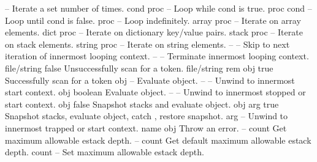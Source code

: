 \begin{longtable}{}
	{--}
	{Iterate a set number of times.}
\hline
\optableent
	{cond proc}
	{{\bf {}}}
	{--}
	{ Loop while cond is true.}
\hline
\optableent
	{proc cond}
	{{\bf {}}}
	{--}
	{ Loop until cond is false.}
\hline
\optableent
	{proc}
	{{\bf {}}}
	{--}
	{ Loop indefinitely.}
\hline
\optableent
	{array proc}
	{{\bf {}}}
	{--}
	{Iterate on array elements.}
\optableent
	{dict proc}
	{{\bf {}}}
	{--}
	{Iterate on dictionary key/value pairs.}
\optableent
	{stack proc}
	{{\bf {}}}
	{--}
	{Iterate on stack elements.}
\optableent
	{string proc}
	{{\bf {}}}
	{--}
	{Iterate on string elements.}
\hline
\optableent
	{--}
	{{\bf {}}}
	{--}
	{Skip to next iteration of innermost looping context.}
\hline
\optableent
	{--}
	{{\bf {}}}
	{--}
	{Terminate innermost looping context.}
\hline
\optableent
	{file/string}
	{{\bf {}}}
	{false}
	{Unsuccessfully scan for a token.}
\optableent
	{file/string}
	{{\bf {}}}
	{rem obj true}
	{Successfully scan for a token}
\hline
\optableent
	{obj}
	{{\bf {}}}
	{--}
	{Evaluate object.}
\hline
\optableent
	{--}
	{{\bf {}}}
	{--}
	{Unwind to innermost start context.}
\hline
\optableent
	{obj}
	{{\bf {}}}
	{boolean}
	{Evaluate object.}
\hline
\optableent
	{--}
	{{\bf {}}}
	{--}
	{Unwind to innermost stopped or start context.}
\hline
\optableent
	{obj}
	{{\bf {}}}
	{false}
	{Snapshot stacks and evaluate object.}
\optableent
	{obj}
	{{\bf {}}}
	{arg true}
	{Snapshot stacks, evaluate object, catch , restore
	snapshot.}
\hline
\optableent
	{arg}
	{{\bf {}}}
	{--}
	{Unwind to innermost trapped or start context.}
\hline
\optableent
	{name}
	{{\bf {}}}
	{obj}
	{Throw an error.}
\hline
\optableent
	{--}
	{{\bf {}}}
	{count}
	{Get maximum allowable estack depth.}
\hline
\optableent
	{--}
	{{\bf {}}}
	{count}
	{Get default maximum allowable estack depth.}
\hline
\optableent
	{count}
	{{\bf {}}}
	{--}
	{Set maximum allowable estack depth.}

\end{longtable}
